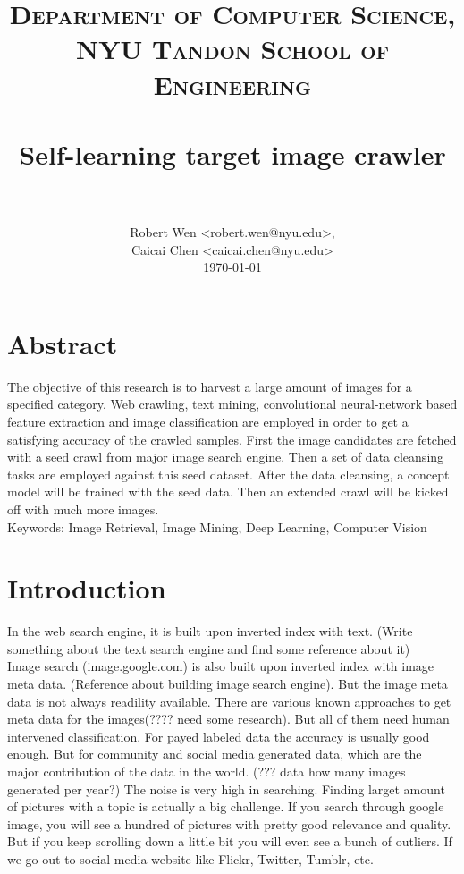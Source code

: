 \documentclass[paper=a4, fontsize=11pt]{scrartcl}
\title{
		\usefont{OT1}{bch}{b}{n}
		\normalfont \normalsize \textsc{Department of Computer Science, NYU Tandon School of Engineering} \\ [25pt]
		\horrule{0.5pt} \\[0.4cm]
		\huge Self-learning target image crawler \\
		\horrule{2pt} \\[0.5cm]
}
\author{
		\normalfont 								\normalsize
        Robert Wen <robert.wen@nyu.edu>,\\[-3pt]		\normalsize
        Caicai Chen <caicai.chen@nyu.edu>\\[-3pt]		\normalsize
        \today
}
\date{}
\numberwithin{equation}{section}		%
\numberwithin{figure}{section}			%
\numberwithin{table}{section}				%
\begin{document}
\maketitle
\section{Abstract}
The objective of this research is to harvest a large amount of images for a specified category. Web crawling, text mining, convolutional neural-network based feature extraction and image classification are employed in order to get a satisfying accuracy of the crawled samples. First the image candidates are fetched with a seed crawl from major image search engine. Then a set of data cleansing tasks are employed against this seed dataset. After the data cleansing, a concept model will be trained with the seed data. Then an extended crawl will be kicked off with much more images.\\

\noindent Keywords: Image Retrieval, Image Mining, Deep Learning, Computer Vision

\newpage


\section{Introduction}

In the web search engine, it is built upon inverted index with text. (Write something about the text search engine and find some reference about it)\\

\noindent Image search (image.google.com) is also built upon inverted index with image meta data. (Reference about building image search engine). But the image meta data is not always readility available. There are various known approaches to get meta data for the images(???? need some research). But all of them need human intervened classification. For payed labeled data the accuracy is usually good enough. But for community and social media generated data, which are the major contribution of the data in the world. (??? data how many images generated per year?) The noise is very high in searching. Finding larget amount of pictures with a topic is actually a big challenge. If you search through google image, you will see a hundred of pictures with pretty good relevance and quality. But if you keep scrolling down a little bit you will even see a bunch of outliers. If we go out to social media website like Flickr, Twitter, Tumblr, etc. \\
\end{document}
